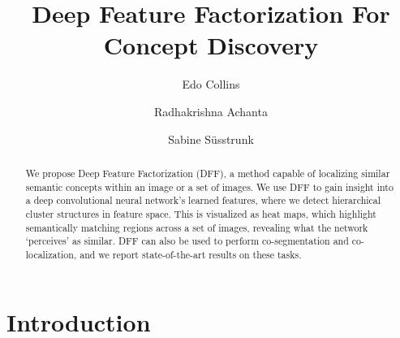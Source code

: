 \documentclass[runningheads]{llncs}
\begin{document}
	\pagestyle{headings}
	\mainmatter
	
	\title{Deep Feature Factorization For Concept Discovery} 

	
	\author{Edo Collins \and Radhakrishna Achanta \and Sabine S\"usstrunk
	}

	\maketitle
	
	\begin{abstract}
		We propose Deep Feature Factorization (DFF), a method capable of localizing similar semantic concepts within an image or a set of images. We use DFF to gain insight into a deep convolutional neural network's learned features, where we detect hierarchical cluster structures in feature space. This is visualized as heat maps, which highlight semantically matching regions across a set of images, revealing what the network `perceives' as similar. DFF can also be used to perform co-segmentation and co-localization, and we report state-of-the-art results on these tasks.
	\end{abstract}
	
	\section{Introduction}
	
\end{document}
